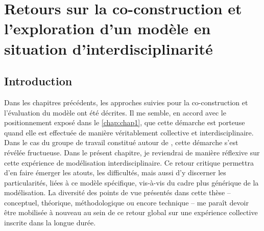 \setcounter{chapter}{5}
\graphicspath{{chap6/}}

\chapter{Retours sur la co-construction et l'exploration d'un modèle en situation d'interdisciplinarité}
\label{chap:chap6}
\setcounter{minitocdepth}{2}
\vfill
{}
\minitoc
{}
\clearpage
{}

\section*{Introduction}

Dans les chapitres précédents, les approches suivies pour la co-construction et l'évaluation du modèle \simfeodal{} ont été décrites.
Il me semble, en accord avec le positionnement exposé dans le \cref{chap:chap1}, que cette démarche est porteuse quand elle est effectuée de manière véritablement collective et interdisciplinaire.
Dans le cas du groupe de travail constitué autour de \simfeodal{}, cette démarche s'est révélée fructueuse.
Dans le présent chapitre, je reviendrai de manière réflexive sur cette expérience de modélisation interdisciplinaire.
Ce retour critique permettra d'en faire émerger les atouts, les difficultés, mais aussi d'y discerner les particularités, liées à ce modèle spécifique, vis-à-vis du cadre plus générique de la modélisation.
La diversité des points de vue présentés dans cette thèse -- conceptuel, théorique, méthodologique ou encore technique -- me paraît devoir être mobilisée à nouveau au sein de ce retour global sur une expérience collective inscrite dans la longue durée.

